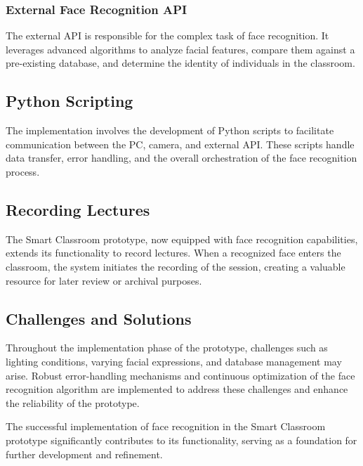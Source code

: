 \documentclass[11pt]{article}
\begin{document}
	\hspace{1cm} \hspace{1cm} \subsubsection{External Face Recognition API}
	\hspace{1cm} \hspace{1cm} The external API is responsible for the complex task of face recognition. It leverages advanced algorithms to analyze facial features, compare them against a pre-existing database, and determine the identity of individuals in the classroom.
	
	\hspace{1cm} \subsection{Python Scripting}
	\hspace{1cm} The implementation involves the development of Python scripts to facilitate communication between the PC, camera, and external API. These scripts handle data transfer, error handling, and the overall orchestration of the face recognition process.
	
	\hspace{1cm} \subsection{Recording Lectures}
	\hspace{1cm} The Smart Classroom prototype, now equipped with face recognition capabilities, extends its functionality to record lectures. When a recognized face enters the classroom, the system initiates the recording of the session, creating a valuable resource for later review or archival purposes.
	
	\hspace{1cm} \subsection{Challenges and Solutions}
	\hspace{1cm} Throughout the implementation phase of the prototype, challenges such as lighting conditions, varying facial expressions, and database management may arise. Robust error-handling mechanisms and continuous optimization of the face recognition algorithm are implemented to address these challenges and enhance the reliability of the prototype.
	
	\hspace{1cm} The successful implementation of face recognition in the Smart Classroom prototype significantly contributes to its functionality, serving as a foundation for further development and refinement.
	
	\pagebreak
	
\end{document}
